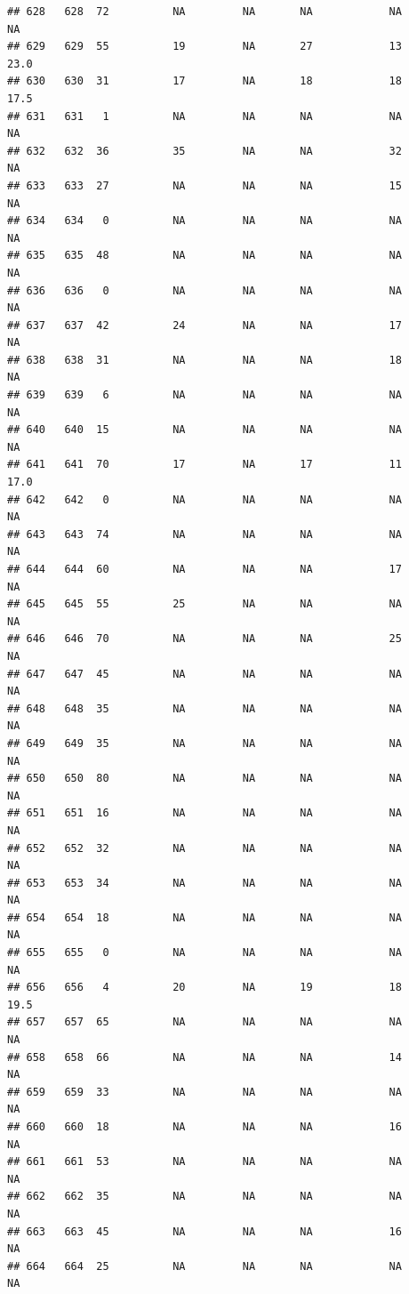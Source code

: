 \documentclass[man]{apa6}
\begin{document}
\begin{verbatim}
## 628   628  72          NA         NA       NA            NA       NA
## 629   629  55          19         NA       27            13     23.0
## 630   630  31          17         NA       18            18     17.5
## 631   631   1          NA         NA       NA            NA       NA
## 632   632  36          35         NA       NA            32       NA
## 633   633  27          NA         NA       NA            15       NA
## 634   634   0          NA         NA       NA            NA       NA
## 635   635  48          NA         NA       NA            NA       NA
## 636   636   0          NA         NA       NA            NA       NA
## 637   637  42          24         NA       NA            17       NA
## 638   638  31          NA         NA       NA            18       NA
## 639   639   6          NA         NA       NA            NA       NA
## 640   640  15          NA         NA       NA            NA       NA
## 641   641  70          17         NA       17            11     17.0
## 642   642   0          NA         NA       NA            NA       NA
## 643   643  74          NA         NA       NA            NA       NA
## 644   644  60          NA         NA       NA            17       NA
## 645   645  55          25         NA       NA            NA       NA
## 646   646  70          NA         NA       NA            25       NA
## 647   647  45          NA         NA       NA            NA       NA
## 648   648  35          NA         NA       NA            NA       NA
## 649   649  35          NA         NA       NA            NA       NA
## 650   650  80          NA         NA       NA            NA       NA
## 651   651  16          NA         NA       NA            NA       NA
## 652   652  32          NA         NA       NA            NA       NA
## 653   653  34          NA         NA       NA            NA       NA
## 654   654  18          NA         NA       NA            NA       NA
## 655   655   0          NA         NA       NA            NA       NA
## 656   656   4          20         NA       19            18     19.5
## 657   657  65          NA         NA       NA            NA       NA
## 658   658  66          NA         NA       NA            14       NA
## 659   659  33          NA         NA       NA            NA       NA
## 660   660  18          NA         NA       NA            16       NA
## 661   661  53          NA         NA       NA            NA       NA
## 662   662  35          NA         NA       NA            NA       NA
## 663   663  45          NA         NA       NA            16       NA
## 664   664  25          NA         NA       NA            NA       NA

\end{verbatim}
\end{document}
